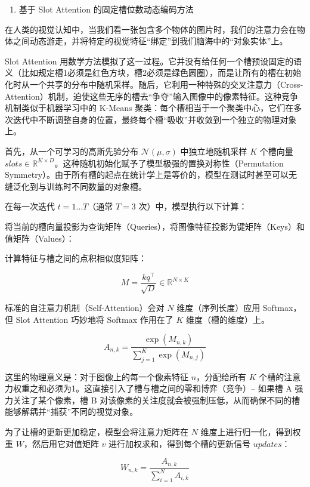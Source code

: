 \begin{enumerate}
\def\labelenumi{\arabic{enumi}.}
\setcounter{enumi}{1}
\tightlist
\item
  基于 Slot Attention 的固定槽位数动态编码方法
\end{enumerate}

在人类的视觉认知中，当我们看一张包含多个物体的图片时，我们的注意力会在物体之间动态游走，并将特定的视觉特征``绑定''到我们脑海中的``对象实体''上。

Slot Attention 用数学方法模拟了这一过程。它并没有给任何一个槽预设固定的语义（比如规定槽1必须是红色方块，槽2必须是绿色圆圈），而是让所有的槽在初始化时从一个共享的分布中随机采样。随后，它利用一种特殊的交叉注意力（Cross-Attention）机制，迫使这些无序的槽去``争夺''输入图像中的像素特征。这种竞争机制类似于机器学习中的 K-Means 聚类：每个槽相当于一个聚类中心，它们在多次迭代中不断调整自身的位置，最终每个槽``吸收''并收敛到一个独立的物理对象上。

首先，从一个可学习的高斯先验分布 \(\mathcal{N}(\mu,\sigma)\) 中独立地随机采样 \(K\) 个槽向量 \(slots \in \mathbb{R}^{K\times D}\)。这种随机初始化赋予了模型极强的置换对称性（Permutation Symmetry）。由于所有槽的起点在统计学上是等价的，模型在测试时甚至可以无缝泛化到与训练时不同数量的对象槽。

在每一次迭代 \(t=1\ldots T\)（通常 \(T=3\) 次）中，模型执行以下计算：

将当前的槽向量投影为查询矩阵（Queries），将图像特征投影为键矩阵（Keys）和值矩阵（Values）：

计算特征与槽之间的点积相似度矩阵：

\[
M = \frac{k q^\top}{\sqrt{D}} \in \mathbb{R}^{N\times K}
\]

标准的自注意力机制（Self-Attention）会对 \(N\) 维度（序列长度）应用 Softmax，但 Slot Attention 巧妙地将 Softmax 作用在了 \(K\) 维度（槽的维度）上。

\[
A_{n,k} = \frac{\exp(M_{n,k})}{\sum_{j=1}^{K}\exp(M_{n,j})}
\]

这里的物理意义是：对于图像上的每一个像素特征 \(n\)，分配给所有 \(K\) 个槽的注意力权重之和必须为1。这直接引入了槽与槽之间的零和博弈（竞争）-- 如果槽 A 强力关注了某个像素，槽 B 对该像素的关注度就会被强制压低，从而确保不同的槽能够解耦并``捕获''不同的视觉对象。

为了让槽的更新更加稳定，模型会将注意力矩阵在 \(N\) 维度上进行归一化，得到权重 \(W\)，然后用它对值矩阵 \(v\) 进行加权求和，得到每个槽的更新信号 \(updates\)：

\[
W_{n,k} = \frac{A_{n,k}}{\sum_{i=1}^{N} A_{i,k}}
\]

